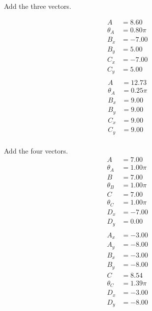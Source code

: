 \documentclass[letterpaper, 11pt]{article}
\begin{document}
 Add the three vectors.  \\ 
\begin{multicols}{ 2 }
\begin{align}
A &=  8.60 \nonumber \\
\theta_A &=  0.80 \pi \nonumber \\
B_x &= -7.00 \nonumber \\  
B_y &=  5.00 \nonumber \\
C_x &= -7.00 \nonumber \\  
C_y &=  5.00 \nonumber \\
\nonumber \end{align}\begin{align}
A &= 12.73 \nonumber \\
\theta_A &=  0.25 \pi \nonumber \\
B_x &=  9.00 \nonumber \\  
B_y &=  9.00 \nonumber \\
C_x &=  9.00 \nonumber \\  
C_y &=  9.00 \nonumber \\
\nonumber \end{align}\end{multicols}

 Add the four vectors.  \\ 
\begin{align}
A &=  7.00 \nonumber \\
\theta_A &=  1.00 \pi \nonumber \\
B &=  7.00 \nonumber \\
\theta_B &=  1.00 \pi \nonumber \\
C &=  7.00 \nonumber \\
\theta_C &=  1.00 \pi \nonumber \\
D_x &= -7.00 \nonumber \\  
D_y &=  0.00 \nonumber \\
\nonumber \end{align}\begin{align}
A_x &= -3.00 \nonumber \\  
A_y &= -8.00 \nonumber \\
B_x &= -3.00 \nonumber \\  
B_y &= -8.00 \nonumber \\
C &=  8.54 \nonumber \\
\theta_C &=  1.39 \pi \nonumber \\
D_x &= -3.00 \nonumber \\  
D_y &= -8.00 \nonumber \\
\nonumber \end{align}
\end{document}
